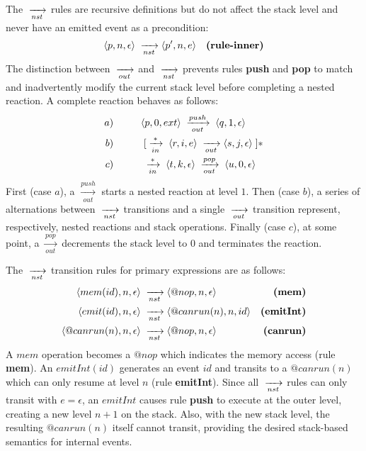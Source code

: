 The $\;\xrightarrow[nst]{\;}$ rules are recursive definitions but do not affect the stack level
and never have an emitted event as a precondition:
%
\begin{align*}
\langle p, n,\epsilon \rangle &\;\xrightarrow[nst]{\;}
\langle p',n,e        \rangle
    & \textbf{(rule-inner)}
\end{align*}
%
The distinction between $\;\xrightarrow[out]{\;}$ and $\;\xrightarrow[nst]{\;}$ prevents rules \textbf{push} and
\textbf{pop} to match and inadvertently modify the current stack level before
completing a nested reaction.
%
A complete reaction behaves as follows:
%
\begin{align*}
a) &\;\;\;\;\;\;\;\;\;\;
    \langle p,0,ext \rangle
        \;\xrightarrow[out]{push}\;
    \langle q,1,\epsilon \rangle
\\
b) &\;\;\;\;\;\;\;\;\;\; \;[ \;\xrightarrow[in]{*}\;
    \langle r,i,e \rangle
        \;\xrightarrow[out]{\;}
    \langle s,j,\epsilon \rangle \;]*
\\
c) &\;\;\;\;\;\;\;\;\;\; \;\xrightarrow[in]{*}\;
    \langle t,k,\epsilon \rangle
        \;\xrightarrow[out]{pop}\;
    \langle u,0,\epsilon \rangle
\end{align*}
%
First (case $a$), a $\xrightarrow[out]{push}$ starts a nested reaction at level
$1$.
Then (case $b$), a series of alternations between $\;\xrightarrow[nst]{\;}$ transitions and a
single $\;\xrightarrow[out]{\;}$ transition represent, respectively, nested reactions and stack
operations.
Finally (case $c$), at some point, a $\xrightarrow[out]{pop}$ decrements the
stack level to $0$ and terminates the reaction.

The $\;\xrightarrow[nst]{\;}$ transition rules for primary expressions are as follows:
%
{ \setlength{\jot}{20pt}
\begin{align*}
\langle mem(id), n, \epsilon \rangle &\;\xrightarrow[nst]{\;}
\langle @nop, n, \epsilon \rangle
    & \textbf{(mem)}        \\
\langle emit(id), n, \epsilon \rangle &\;\xrightarrow[nst]{\;}
\langle @canrun(n), n, id \rangle
    & \textbf{(emitInt)}    \\
\langle @canrun(n), n, \epsilon \rangle &\;\xrightarrow[nst]{\;}
\langle @nop, n, \epsilon \rangle
    & \textbf{(canrun)}     \\
\end{align*}
}
%
A $mem$ operation becomes a $@nop$ which indicates the memory access (rule
\textbf{mem}).
An $emitInt(id)$ generates an event $id$ and transits to a $@canrun(n)$ which
can only resume at level $n$ (rule \textbf{emitInt}).
Since all $\;\xrightarrow[nst]{\;}$ rules can only transit with $e=\epsilon$, an $emitInt$ causes
rule \textbf{push} to execute at the outer level, creating a new level $n+1$ on
the stack.
Also, with the new stack level, the resulting $@canrun(n)$ itself cannot
transit, providing the desired stack-based semantics for internal events.

